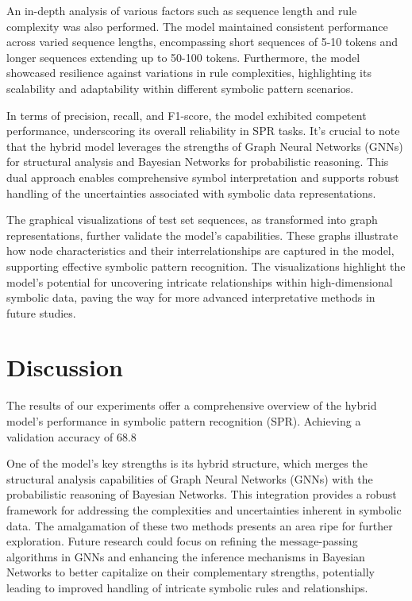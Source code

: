 \documentclass{article}
\begin{document}
An in-depth analysis of various factors such as sequence length and rule complexity was also performed. The model maintained consistent performance across varied sequence lengths, encompassing short sequences of 5-10 tokens and longer sequences extending up to 50-100 tokens. Furthermore, the model showcased resilience against variations in rule complexities, highlighting its scalability and adaptability within different symbolic pattern scenarios.

In terms of precision, recall, and F1-score, the model exhibited competent performance, underscoring its overall reliability in SPR tasks. It's crucial to note that the hybrid model leverages the strengths of Graph Neural Networks (GNNs) for structural analysis and Bayesian Networks for probabilistic reasoning. This dual approach enables comprehensive symbol interpretation and supports robust handling of the uncertainties associated with symbolic data representations.

The graphical visualizations of test set sequences, as transformed into graph representations, further validate the model's capabilities. These graphs illustrate how node characteristics and their interrelationships are captured in the model, supporting effective symbolic pattern recognition. The visualizations highlight the model's potential for uncovering intricate relationships within high-dimensional symbolic data, paving the way for more advanced interpretative methods in future studies.
\section{Discussion}
The results of our experiments offer a comprehensive overview of the hybrid model's performance in symbolic pattern recognition (SPR). Achieving a validation accuracy of 68.8%

One of the model's key strengths is its hybrid structure, which merges the structural analysis capabilities of Graph Neural Networks (GNNs) with the probabilistic reasoning of Bayesian Networks. This integration provides a robust framework for addressing the complexities and uncertainties inherent in symbolic data. The amalgamation of these two methods presents an area ripe for further exploration. Future research could focus on refining the message-passing algorithms in GNNs and enhancing the inference mechanisms in Bayesian Networks to better capitalize on their complementary strengths, potentially leading to improved handling of intricate symbolic rules and relationships.
\end{document}
